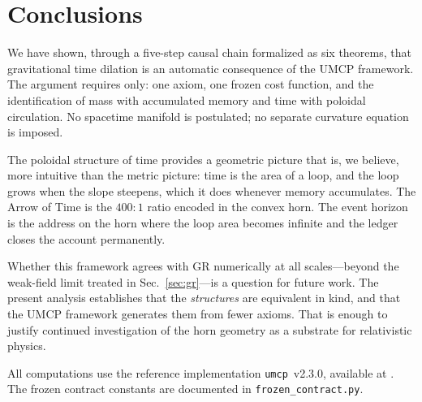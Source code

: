 \documentclass[
  aps,
  prd,
  twocolumn,
  superscriptaddress,
  nofootinbib,
  floatfix
]{revtex4-2}
\begin{document}
\section{Conclusions}\label{sec:conclusions}

We have shown, through a five-step causal chain formalized
as six theorems, that gravitational time dilation is an
automatic consequence of the UMCP framework.  The
argument requires only: one axiom, one frozen cost function,
and the identification of mass with accumulated memory and
time with poloidal circulation.  No spacetime manifold is
postulated; no separate curvature equation is imposed.

The poloidal structure of time provides a geometric picture
that is, we believe, more intuitive than the metric picture:
time is the area of a loop, and the loop grows when the
slope steepens, which it does whenever memory accumulates.
The Arrow of Time is the $400:1$ ratio encoded in the
convex horn.  The event horizon is the address on the horn
where the loop area becomes infinite and the ledger closes
the account permanently.

Whether this framework agrees with GR numerically at all
scales---beyond the weak-field limit treated in
Sec.~\ref{sec:gr}---is a question for future work.  The
present analysis establishes that the \emph{structures} are
equivalent in kind, and that the UMCP framework generates
them from fewer axioms.  That is enough to justify
continued investigation of the horn geometry as a substrate
for relativistic physics.

\begin{acknowledgments}
All computations use the reference implementation
\texttt{umcp}~v2.3.0, available at
\cite{umcpmetadatarepo,umcppypi}.  The frozen contract
constants are documented in \texttt{frozen\_contract.py}.
\end{acknowledgments}


\end{document}
